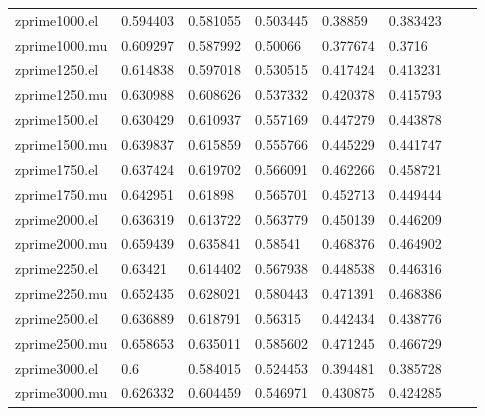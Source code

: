 \begin{table}[H]
\begin{tabular}{l|lllllll}
      zprime1000.el & 0.594403   & 0.581055   & 0.503445   & 0.38859     & 0.383423    \\
      zprime1000.mu & 0.609297   & 0.587992   & 0.50066    & 0.377674    & 0.3716      \\
      zprime1250.el & 0.614838   & 0.597018   & 0.530515   & 0.417424    & 0.413231    \\
      zprime1250.mu & 0.630988   & 0.608626   & 0.537332   & 0.420378    & 0.415793    \\
      zprime1500.el & 0.630429   & 0.610937   & 0.557169   & 0.447279    & 0.443878    \\
      zprime1500.mu & 0.639837   & 0.615859   & 0.555766   & 0.445229    & 0.441747    \\
      zprime1750.el & 0.637424   & 0.619702   & 0.566091   & 0.462266    & 0.458721    \\
      zprime1750.mu & 0.642951   & 0.61898    & 0.565701   & 0.452713    & 0.449444    \\
      zprime2000.el & 0.636319   & 0.613722   & 0.563779   & 0.450139    & 0.446209    \\
      zprime2000.mu & 0.659439   & 0.635841   & 0.58541    & 0.468376    & 0.464902    \\
      zprime2250.el & 0.63421    & 0.614402   & 0.567938   & 0.448538    & 0.446316    \\
      zprime2250.mu & 0.652435   & 0.628021   & 0.580443   & 0.471391    & 0.468386    \\
      zprime2500.el & 0.636889   & 0.618791   & 0.56315    & 0.442434    & 0.438776    \\
      zprime2500.mu & 0.658653   & 0.635011   & 0.585602   & 0.471245    & 0.466729    \\
      zprime3000.el & 0.6        & 0.584015   & 0.524453   & 0.394481    & 0.385728    \\
      zprime3000.mu & 0.626332   & 0.604459   & 0.546971   & 0.430875    & 0.424285
    \end{tabular}
    \label{tab:eff_a}

  \end{table}



